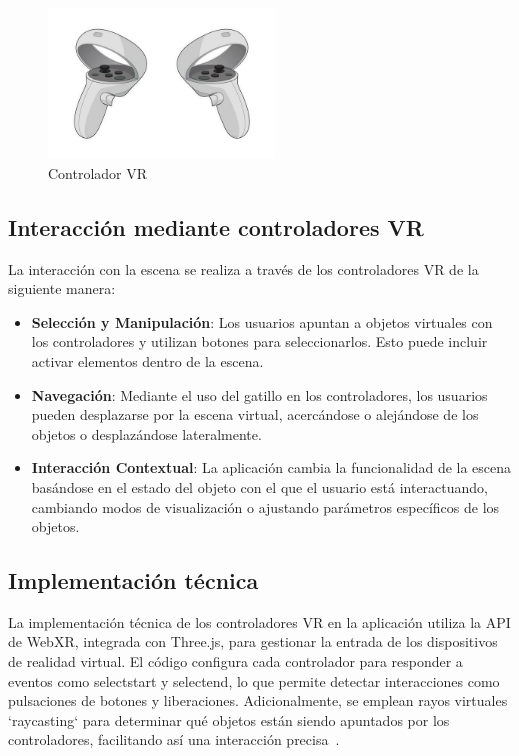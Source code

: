 \documentclass[a4paper, 12pt]{book}
\begin{document}
\begin{figure}
  \centering
  \includegraphics[width=6cm, keepaspectratio]{img/controlador.png}
  \caption{Controlador VR}
  \label{fig:controlador}
\end{figure}


\subsection{Interacción mediante controladores VR}
\label{subsec:interaccion_controladores_vr}

La interacción con la escena se realiza a través de los controladores VR de la siguiente manera:

\begin{itemize}
  \item \textbf{Selección y Manipulación}: Los usuarios apuntan a objetos virtuales con los controladores y utilizan 
  botones para seleccionarlos. Esto puede incluir activar elementos dentro de la escena.
  \item \textbf{Navegación}: Mediante el uso del gatillo en los controladores, 
  los usuarios pueden desplazarse por la escena virtual, acercándose o alejándose de los objetos o desplazándose lateralmente.
  \item \textbf{Interacción Contextual}: La aplicación cambia la funcionalidad de la escena 
  basándose en el estado del objeto con el que el usuario está interactuando, 
  cambiando modos de visualización o ajustando parámetros específicos de los objetos.
\end{itemize}

\subsection{Implementación técnica}
\label{subsec:implementacion_tecnica_vr}

La implementación técnica de los controladores VR en la aplicación utiliza la API de WebXR, integrada con Three.js, para gestionar la entrada 
de los dispositivos de realidad virtual. El código configura cada controlador para responder a eventos como selectstart y selectend, 
lo que permite detectar interacciones como pulsaciones de botones y liberaciones. Adicionalmente, se emplean rayos virtuales `raycasting` 
para determinar qué objetos están siendo apuntados por los controladores, facilitando así una interacción precisa~\cite{Using_a_WebXR_controller_using_Three.JS}.
\end{document}

